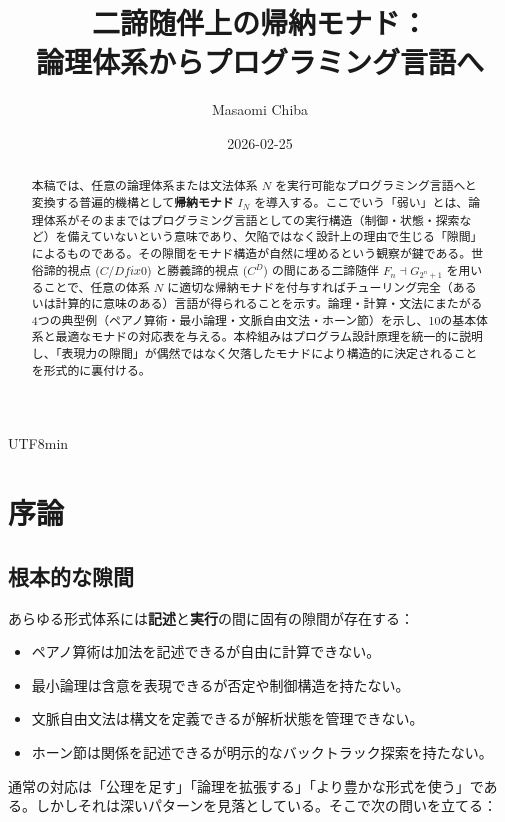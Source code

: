 \documentclass[a4paper,11pt]{article}
\title{二諦随伴上の帰納モナド：\\
論理体系からプログラミング言語へ}
\author{Masaomi Chiba}
\date{2026-02-25}
\renewcommand{\emph}[1]{\textbf{#1}}
\theoremstyle{definition}
\begin{document}
\begin{CJK}{UTF8}{min}

\maketitle

\begin{abstract}
本稿では、任意の論理体系または文法体系 $N$ を実行可能なプログラミング言語へと変換する普遍的機構として\emph{帰納モナド} $I_N$ を導入する。ここでいう「弱い」とは、論理体系がそのままではプログラミング言語としての実行構造（制御・状態・探索など）を備えていないという意味であり、欠陥ではなく設計上の理由で生じる「隙間」によるものである。その隙間をモナド構造が自然に埋めるという観察が鍵である。世俗諦的視点 ($C/Dfix0$) と勝義諦的視点 ($C^D$) の間にある二諦随伴 $F_n \dashv G_{2^n+1}$ を用いることで、任意の体系 $N$ に適切な帰納モナドを付与すればチューリング完全（あるいは計算的に意味のある）言語が得られることを示す。論理・計算・文法にまたがる4つの典型例（ペアノ算術・最小論理・文脈自由文法・ホーン節）を示し、10の基本体系と最適なモナドの対応表を与える。本枠組みはプログラム設計原理を統一的に説明し、「表現力の隙間」が偶然ではなく欠落したモナドにより構造的に決定されることを形式的に裏付ける。
\end{abstract}

\section{序論}

\subsection{根本的な隙間}

あらゆる形式体系には\emph{記述}と\emph{実行}の間に固有の隙間が存在する：

\begin{itemize}
  \item ペアノ算術は加法を記述できるが自由に計算できない。
  \item 最小論理は含意を表現できるが否定や制御構造を持たない。
  \item 文脈自由文法は構文を定義できるが解析状態を管理できない。
  \item ホーン節は関係を記述できるが明示的なバックトラック探索を持たない。
\end{itemize}

通常の対応は「公理を足す」「論理を拡張する」「より豊かな形式を使う」である。しかしそれは深いパターンを見落としている。そこで次の問いを立てる：


\end{CJK}
\end{document}
